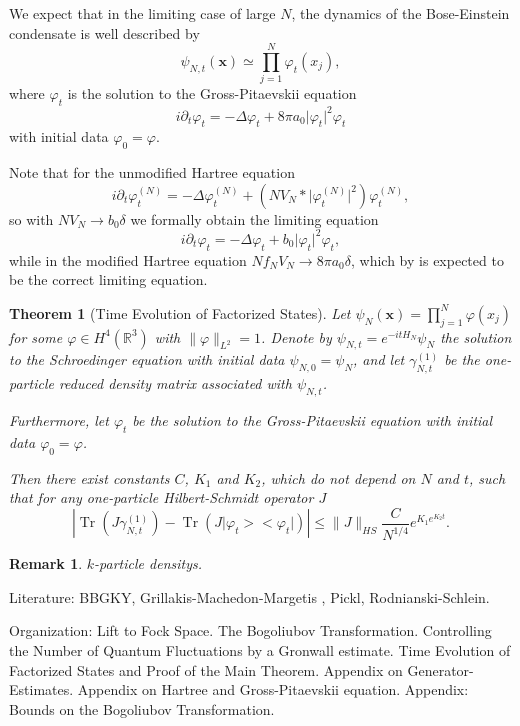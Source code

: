 \documentclass[11pt,a4paper,draft,DIV11]{scrartcl}	%
\newtheorem{thm}{Theorem}[section]
\newtheorem*{rem}{Remark}
\newcommand{\Rbb}{\mathbb{R}}		%
\newcommand{\norm}[1]{\lVert#1\rVert}	%
\newcommand{\ph}{\varphi_t^{(N)}}	%
\newcommand{\project}[1]{\lvert #1 \big>\big< #1\rvert}	%
\newcommand{\Tr}{\operatorname{Tr}}	%
\newcommand{\xn}{\mathbf{x}}		%
\newcommand{\bd}{\begin{displaymath}}			%
\newcommand{\ed}{\end{displaymath}}
\begin{document}
We expect that in the limiting case of large $N$, the dynamics of the Bose-Einstein condensate is well described by
\bd
\psi_{N,t}(\xn) \simeq \prod_{j=1}^N \varphi_t(x_j),
\ed
where $\varphi_t$ is the solution to the Gross-Pitaevskii equation
\bd
i \partial_t \varphi_t = - \Delta \varphi_t + 8\pi a_0 \lvert \varphi_t\rvert^2 \varphi_t
\ed
with initial data $\varphi_0 = \varphi$.

Note that for the unmodified Hartree equation
\[
i \partial_t \ph = -\Delta \ph + \left(N V_N \ast \lvert \ph\rvert^2 \right) \ph,
\]
so with $N V_N \to b_0 \delta$ we formally obtain the limiting equation
\bd
i \partial_t \varphi_t = - \Delta \varphi_t + b_0 \lvert \varphi_t\rvert^2 \varphi_t,
\ed
while in the modified Hartree equation $N f_N V_N \to 8 \pi a_0 \delta$, which by \cite{ESY2010} is expected to be the correct limiting equation.

\begin{thm}[Time Evolution of Factorized States] \label{thm:main_factorized}
 Let $\psi_N(\xn) = \prod_{j=1}^N \varphi(x_j)$ for some $\varphi \in H^4(\Rbb^3)$ with $\norm{\varphi}_{L^2} = 1$. Denote by $\psi_{N,t} = e^{-it H_N}\psi_N$ the solution to the Schroedinger equation with initial data $\psi_{N,0}= \psi_N$, and let $\gamma_{N,t}^{(1)}$ be the one-particle reduced density matrix associated with $\psi_{N,t}$.

 Furthermore, let $\varphi_t$ be the solution to the Gross-Pitaevskii equation with initial data $\varphi_0 = \varphi$.

 Then there exist constants $C$, $K_1$ and $K_2$, which do not depend on $N$ and $t$, such that for any one-particle Hilbert-Schmidt operator $J$
\bd
\left\lvert \Tr\left(J \gamma_{N,t}^{(1)} \right) - \Tr\left( J \project{\varphi_t}  \right) \right\rvert \leq \norm{J}_{HS} \frac{C}{N^{1/4}}e^{K_1 e^{K_2 t}}.
\ed
\end{thm}

\begin{rem}
$k$-particle densitys. 
\end{rem}

Literature: BBGKY, Grillakis-Machedon-Margetis \cite{GMM2010}, Pickl, Rodnianski-Schlein.

Organization: Lift to Fock Space. The Bogoliubov Transformation. Controlling the Number of Quantum Fluctuations by a Gronwall estimate. Time Evolution of Factorized States and Proof of the Main Theorem. Appendix on Generator-Estimates. Appendix on Hartree and Gross-Pitaevskii equation. Appendix: Bounds on the Bogoliubov Transformation.
\end{document}
